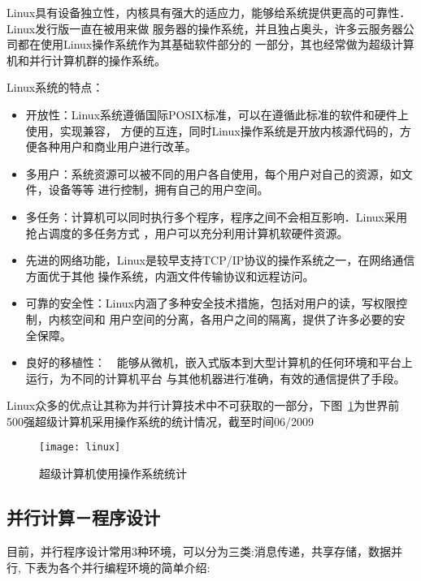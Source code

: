     Linux具有设备独立性，内核具有强大的适应力，能够给系统提供更高的可靠性．Linux发行版一直在被用来做
服务器的操作系统，并且独占奥头，许多云服务器公司都在使用Linux操作系统作为其基础软件部分的
一部分，其也经常做为超级计算机和并行计算机群的操作系统。
    
    Linux系统的特点：
    \begin{itemize}
    \item 开放性：Linux系统遵循国际POSIX标准，可以在遵循此标准的软件和硬件上使用，实现兼容，
方便的互连，同时Linux操作系统是开放内核源代码的，方便各种用户和商业用户进行改革。
    \item 多用户：系统资源可以被不同的用户各自使用，每个用户对自己的资源，如文件，设备等等
进行控制，拥有自己的用户空间。    
    \item 多任务：计算机可以同时执行多个程序，程序之间不会相互影响．Linux采用抢占调度的多任务方式
，用户可以充分利用计算机软硬件资源。
    \item 先进的网络功能，Linux是较早支持TCP/IP协议的操作系统之一，在网络通信方面优于其他
操作系统，内涵文件传输协议和远程访问。
    \item 可靠的安全性：Linux内涵了多种安全技术措施，包括对用户的读，写权限控制，内核空间和
用户空间的分离，各用户之间的隔离，提供了许多必要的安全保障。
    \item 良好的移植性：　能够从微机，嵌入式版本到大型计算机的任何环境和平台上运行，为不同的计算机平台
与其他机器进行准确，有效的通信提供了手段。
    \end{itemize}

    Linux众多的优点让其称为并行计算技术中不可获取的一部分，下图~\ref{fig:linux}为世界前500强超级计算机采用操作系统的统计情况，截至时间06/2009
    \begin{figure}[htbp]
    \centering
    \texttt{[image: linux]}
    \caption{超级计算机使用操作系统统计}\label{fig:linux}
    \vspace{\baselineskip}
    \end{figure}

\subsection{并行计算－程序设计}
    目前，并行程序设计常用3种环境，可以分为三类:消息传递，共享存储，数据并行,
下表为各个并行编程环境的简单介绍:

